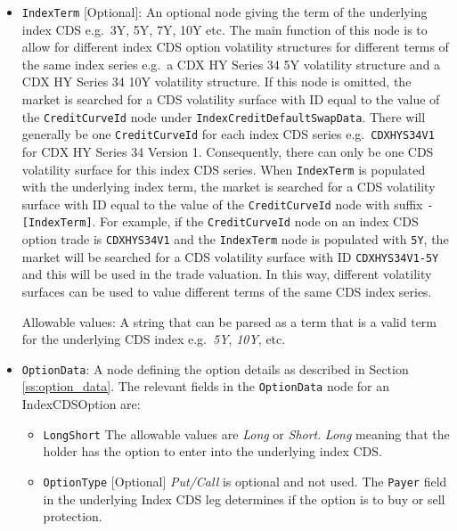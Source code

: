 \begin{itemize}

\item
\lstinline!IndexTerm! [Optional]: An optional node giving the term of the underlying index CDS e.g.\ 3Y, 5Y, 7Y, 10Y etc. The main function of this node is to allow for different index CDS option volatility structures for different terms of the same index series e.g.\ a CDX HY Series 34 5Y volatility structure and a CDX HY Series 34 10Y volatility structure. If this node is omitted, the market is searched for a CDS volatility surface with ID equal to the value of the \lstinline!CreditCurveId! node under \lstinline!IndexCreditDefaultSwapData!. There will generally be one \lstinline!CreditCurveId! for each index CDS series e.g.\ \lstinline!CDXHYS34V1! for CDX HY Series 34 Version 1. Consequently, there can only be one CDS volatility surface for this index CDS series. When \lstinline!IndexTerm! is populated with the underlying index term, the market is searched for a CDS volatility surface with ID equal to the value of the \lstinline!CreditCurveId! node with suffix \lstinline!-[IndexTerm]!. For example, if the \lstinline!CreditCurveId! node on an index CDS option trade is \lstinline!CDXHYS34V1! and the \lstinline!IndexTerm! node is populated with \lstinline!5Y!, the market will be searched for a CDS volatility surface with ID \lstinline!CDXHYS34V1-5Y! and this will be used in the trade valuation. In this way, different volatility surfaces can be used to value different terms of the same CDS index series.

Allowable values: A string that can be parsed as a term that is a valid term for the underlying CDS index e.g.\ \emph{5Y}, \emph{10Y}, etc.

\item
\lstinline!OptionData!: A node defining the option details as described in Section \ref{ss:option_data}. 
The relevant fields in the \lstinline!OptionData! node for an IndexCDSOption are:

\begin{itemize}
\item \lstinline!LongShort! The allowable values are \emph{Long} or \emph{Short}. \emph{Long} meaning that the holder has the option to enter into the underlying index CDS.

\item \lstinline!OptionType! [Optional] \emph{Put/Call} is optional and not used. The \lstinline!Payer! field in the underlying Index CDS leg  determines if the option is to buy or sell protection.


\end{itemize}
\end{itemize}
